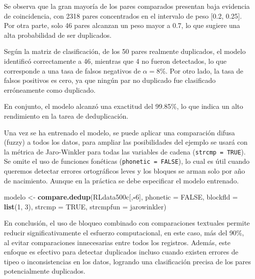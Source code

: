 \documentclass[
  12pt,
]{book}
\newenvironment{Shaded}{\begin{snugshade}}{\end{snugshade}}
\newcommand{\AttributeTok}[1]{\textcolor[rgb]{0.13,0.29,0.53}{#1}}
\newcommand{\ConstantTok}[1]{\textcolor[rgb]{0.56,0.35,0.01}{#1}}
\newcommand{\DecValTok}[1]{\textcolor[rgb]{0.00,0.00,0.81}{#1}}
\newcommand{\FunctionTok}[1]{\textcolor[rgb]{0.13,0.29,0.53}{\textbf{#1}}}
\newcommand{\NormalTok}[1]{#1}
\newcommand{\OtherTok}[1]{\textcolor[rgb]{0.56,0.35,0.01}{#1}}
\newcommand{\SpecialCharTok}[1]{\textcolor[rgb]{0.81,0.36,0.00}{\textbf{#1}}}
\begin{document}
Se observa que la gran mayoría de los pares comparados presentan baja evidencia de coincidencia, con 2318 pares concentrados en el intervalo de peso {[}0.2, 0.25{]}. Por otra parte, solo 46 pares alcanzan un peso mayor a 0.7, lo que sugiere una alta probabilidad de ser duplicados.

Según la matriz de clasificación, de los 50 pares realmente duplicados, el modelo identificó correctamente a 46, mientras que 4 no fueron detectados, lo que corresponde a una tasa de falsos negativos de \(\alpha = 8\)\%. Por otro lado, la tasa de falsos positivos es cero, ya que ningún par no duplicado fue clasificado erróneamente como duplicado.

En conjunto, el modelo alcanzó una exactitud del 99.85\%, lo que indica un alto rendimiento en la tarea de deduplicación.

Una vez se ha entrenado el modelo, se puede aplicar una comparación difusa (fuzzy) a todos los datos, para ampliar las posibilidades del ejemplo se usará con la métrica de Jaro-Winkler para todas las variables de cadena (\texttt{strcmp\ =\ TRUE}). Se omite el uso de funciones fonéticas (\texttt{phonetic\ =\ FALSE}), lo cual es útil cuando queremos detectar errores ortográficos leves y los bloques se arman solo por año de nacimiento. Aunque en la práctica se debe especificar el modelo entrenado.

\begin{Shaded}
\begin{Highlighting}[]
\NormalTok{modelo }\OtherTok{\textless{}{-}} \FunctionTok{compare.dedup}\NormalTok{(RLdata500c[,}\SpecialCharTok{{-}}\DecValTok{6}\NormalTok{],}
                        \AttributeTok{phonetic =} \ConstantTok{FALSE}\NormalTok{,}
                        \AttributeTok{blockfld =} \FunctionTok{list}\NormalTok{(}\DecValTok{1}\NormalTok{, }\DecValTok{3}\NormalTok{),}
                        \AttributeTok{strcmp =} \ConstantTok{TRUE}\NormalTok{,}
                        \AttributeTok{strcmpfun =}\NormalTok{ jarowinkler)}
\end{Highlighting}
\end{Shaded}

En conclusión, el uso de bloqueo combinado con comparaciones textuales permite reducir significativamente el esfuerzo computacional, en este caso, más del 90\%, al evitar comparaciones innecesarias entre todos los registros. Además, este enfoque es efectivo para detectar duplicados incluso cuando existen errores de tipeo o inconsistencias en los datos, logrando una clasificación precisa de los pares potencialmente duplicados.
\end{document}
